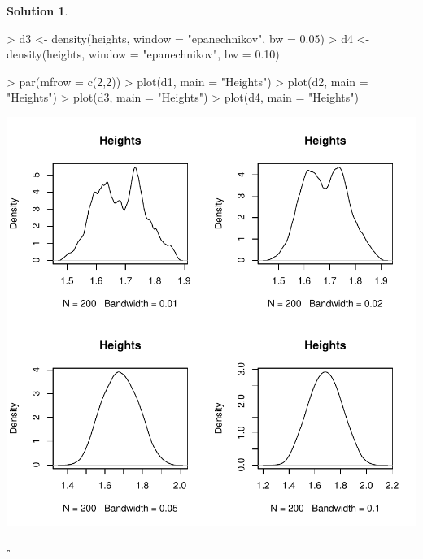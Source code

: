 \documentclass[twoside]{article}
\theoremstyle{definition}
\newtheorem*{solutionT}{Solution}
\newenvironment{solution}{\begin{cBox}\begin{solutionT}}{\hfill{\scriptsize\ensuremath{\square}}\end{solutionT}\end{cBox}}
\theoremstyle{definition}
\begin{document}
\begin{enumerate}
\begin{solution}
\begin{Schunk}
\begin{Sinput}
> d3 <- density(heights, window = "epanechnikov", bw = 0.05)
> d4 <- density(heights, window = "epanechnikov", bw = 0.10)
\end{Sinput}
\end{Schunk}
\begin{Schunk}
\begin{Sinput}
> par(mfrow = c(2,2))
> plot(d1, main = "Heights")
> plot(d2, main = "Heights")
> plot(d3, main = "Heights")
> plot(d4, main = "Heights")
\end{Sinput}
\end{Schunk}
\includegraphics{week3-005}


\end{solution}
\end{enumerate}
\end{document}
